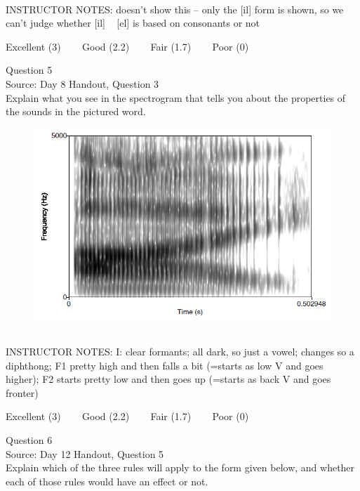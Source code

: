 \documentclass[12pt]{article}
\begin{document}
~\\
INSTRUCTOR NOTES: doesn't show this -- only the [il] form is shown, so we can't judge whether [il] ~ [el] is based on consonants or not


\vfill
Excellent (3) ~~~ Good (2.2) ~~~ Fair (1.7) ~~~ Poor (0)
\newpage

{\large Question 5}\\

Source: Day 8 Handout, Question 3\\

Explain what you see in the spectrogram that tells you about the properties of the sounds in the pictured word.\\

\begin{figure}[H]
\includegraphics{../images/spectrogram_I.png}
\end{figure}

~\\
INSTRUCTOR NOTES: I: clear formants; all dark, so just a vowel; changes so a diphthong; F1 pretty high and then falls a bit (=starts as low V and goes higher); F2 starts pretty low and then goes up (=starts as back V and goes fronter)


\vfill
Excellent (3) ~~~ Good (2.2) ~~~ Fair (1.7) ~~~ Poor (0)
\newpage

{\large Question 6}\\

Source: Day 12 Handout, Question 5\\

Explain which of the three rules will apply to the form given below, and whether each of those rules would have an effect or not.\\
\end{document}
